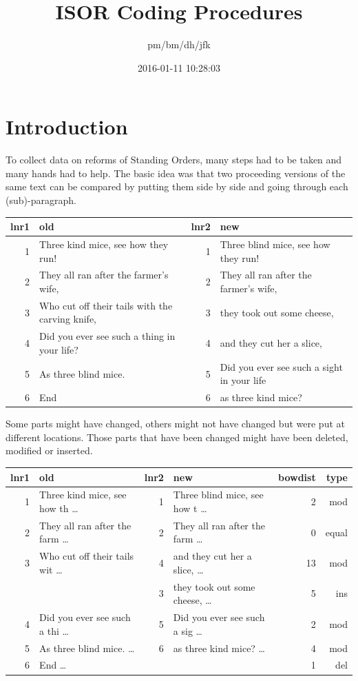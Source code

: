 \documentclass[10pt,]{article}
\title{ISOR Coding Procedures}
\author{pm/bm/dh/jfk}
\date{2016-01-11 10:28:03}
\begin{document}
\maketitle

{
\hypersetup{linkcolor=black}
\setcounter{tocdepth}{2}
\tableofcontents
}
\makeatletter
\newcommand{\justified}{%
  \rightskip\z@skip%
  \leftskip\z@skip} \makeatother

\newpage

\section{Introduction}\label{introduction}

To collect data on reforms of Standing Orders, many steps had to be
taken and many hands had to help. The basic idea was that two proceeding
versions of the same text can be compared by putting them side by side
and going through each (sub)-paragraph.

\begin{longtable}[c]{@{}rlrl@{}}
\toprule
lnr1 & old & lnr2 & new\tabularnewline
\midrule
\endhead
1 & Three kind mice, see how they run! & 1 & Three blind mice, see how
they run!\tabularnewline
2 & They all ran after the farmer's wife, & 2 & They all ran after the
farmer's wife,\tabularnewline
3 & Who cut off their tails with the carving knife, & 3 & they took out
some cheese,\tabularnewline
4 & Did you ever see such a thing in your life? & 4 & and they cut her a
slice,\tabularnewline
5 & As three blind mice. & 5 & Did you ever see such a sight in your
life\tabularnewline
6 & End & 6 & as three kind mice?\tabularnewline
\bottomrule
\end{longtable}

Some parts might have changed, others might not have changed but were
put at different locations. Those parts that have been changed might
have been deleted, modified or inserted.

\begin{longtable}[c]{@{}rlrlrr@{}}
\toprule
lnr1 & old & lnr2 & new & bowdist & type\tabularnewline
\midrule
\endhead
1 & Three kind mice, see how th \ldots{} & 1 & Three blind mice, see how
t \ldots{} & 2 & mod\tabularnewline
2 & They all ran after the farm \ldots{} & 2 & They all ran after the
farm \ldots{} & 0 & equal\tabularnewline
3 & Who cut off their tails wit \ldots{} & 4 & and they cut her a slice,
\ldots{} & 13 & mod\tabularnewline
& & 3 & they took out some cheese, \ldots{} & 5 & ins\tabularnewline
4 & Did you ever see such a thi \ldots{} & 5 & Did you ever see such a
sig \ldots{} & 2 & mod\tabularnewline
5 & As three blind mice. \ldots{} & 6 & as three kind mice? \ldots{} & 4
& mod\tabularnewline
6 & End \ldots{} & & & 1 & del\tabularnewline
\bottomrule
\end{longtable}
\end{document}
